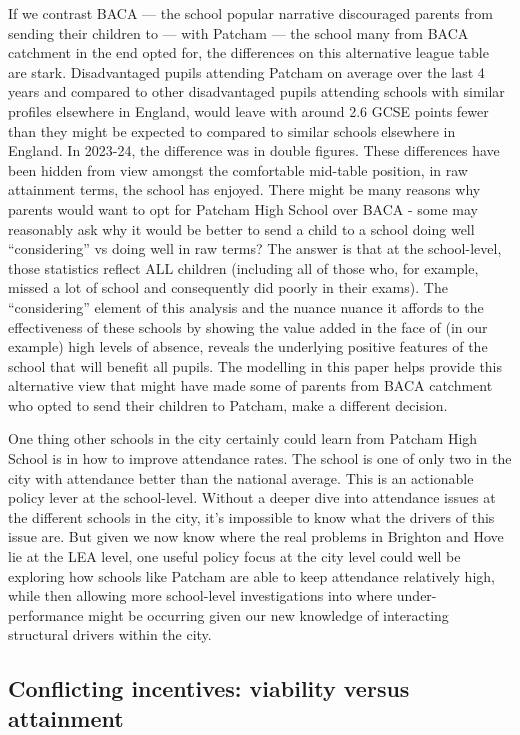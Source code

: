 \documentclass[
  12pt,
  titlepage]{article}
\begin{document}
If we contrast BACA --- the school popular narrative discouraged parents
from sending their children to --- with Patcham --- the school many from
BACA catchment in the end opted for, the differences on this alternative
league table are stark. Disadvantaged pupils attending Patcham on
average over the last 4 years and compared to other disadvantaged pupils
attending schools with similar profiles elsewhere in England, would
leave with around 2.6 GCSE points fewer than they might be expected to
compared to similar schools elsewhere in England. In 2023-24, the
difference was in double figures. These differences have been hidden
from view amongst the comfortable mid-table position, in raw attainment
terms, the school has enjoyed. There might be many reasons why parents
would want to opt for Patcham High School over BACA - some may
reasonably ask why it would be better to send a child to a school doing
well ``considering'' vs doing well in raw terms? The answer is that at
the school-level, those statistics reflect ALL children (including all
of those who, for example, missed a lot of school and consequently did
poorly in their exams). The ``considering'' element of this analysis and
the nuance nuance it affords to the effectiveness of these schools by
showing the value added in the face of (in our example) high levels of
absence, reveals the underlying positive features of the school that
will benefit all pupils. The modelling in this paper helps provide this
alternative view that might have made some of parents from BACA
catchment who opted to send their children to Patcham, make a different
decision.

One thing other schools in the city certainly could learn from Patcham
High School is in how to improve attendance rates. The school is one of
only two in the city with attendance better than the national average.
This is an actionable policy lever at the school-level. Without a deeper
dive into attendance issues at the different schools in the city, it's
impossible to know what the drivers of this issue are. But given we now
know where the real problems in Brighton and Hove lie at the LEA level,
one useful policy focus at the city level could well be exploring how
schools like Patcham are able to keep attendance relatively high, while
then allowing more school-level investigations into where
under-performance might be occurring given our new knowledge of
interacting structural drivers within the city.

\subsection{Conflicting incentives: viability versus
attainment}\label{conflicting-incentives-viability-versus-attainment}
\end{document}
